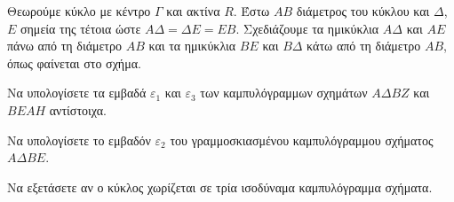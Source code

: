 Θεωρούμε κύκλο με κέντρο $\Gamma$ και ακτίνα $R$. Έστω $AB$ διάμετρος του κύκλου και $\Delta$, $E$ σημεία της τέτοια ώστε $A\Delta = \Delta E = EB$. Σχεδιάζουμε τα ημικύκλια $A\Delta$ και $AE$ πάνω από τη διάμετρο $AB$ και τα ημικύκλια $BE$ και $B\Delta$ κάτω από τη διάμετρο $AB$, όπως φαίνεται στο σχήμα.

\begin{alist}
\item Να υπολογίσετε τα εμβαδά $\varepsilon_1$ και $\varepsilon_3$ των καμπυλόγραμμων σχημάτων $A\Delta BZ$ και $BEAH$ αντίστοιχα. 
\item Να υπολογίσετε το εμβαδόν $\varepsilon_2$ του γραμμοσκιασμένου καμπυλόγραμμου σχήματος $A\Delta BE$. 
\item Να εξετάσετε αν ο κύκλος χωρίζεται σε τρία ισοδύναμα καμπυλόγραμμα σχήματα. 
\end{alist}